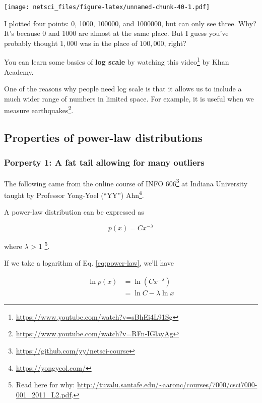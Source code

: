 \documentclass[
]{krantz}
\makeatletter
\renewcommand{\href}[2]{#2\footnote{\url{#1}}}
\newenvironment{kframe}{%
\medskip{}
\setlength{\fboxsep}{.8em}
 \def\at@end@of@kframe{}%
 \ifinner\ifhmode%
  \def\at@end@of@kframe{\end{minipage}}%
  \begin{minipage}{\columnwidth}%
 \fi\fi%
 \def\FrameCommand##1{\hskip\@totalleftmargin \hskip-\fboxsep
 \colorbox{shadecolor}{##1}\hskip-\fboxsep
     \hskip-\linewidth \hskip-\@totalleftmargin \hskip\columnwidth}%
 \MakeFramed {\advance\hsize-\width
   \@totalleftmargin\z@ \linewidth\hsize
   \@setminipage}}%
 {\par\unskip\endMakeFramed%
 \at@end@of@kframe}
\newenvironment{rmdblock}[1]
  {
  \begin{itemize}
  \renewcommand{\labelitemi}{
    \raisebox{-.7\height}[0pt][0pt]{
      {\setkeys{Gin}{width=3em,keepaspectratio}\texttt{[image: images/\#1]}}
    }
  }
  \setlength{\fboxsep}{1em}
  \begin{kframe}
  \item
  }
  {
  \end{kframe}
  \end{itemize}
  }
\newenvironment{rmdnote}
  {\begin{rmdblock}{note}}
  {\end{rmdblock}}
\makeatother
\begin{document}
\texttt{[image: netsci\_files/figure-latex/unnamed-chunk-40-1.pdf]}

I plotted four points: 0, 1000, 100000, and 1000000, but can only see three. Why? It's because 0 and 1000 are almost at the same place. But I guess you've probably thought \(1,000\) was in the place of \(100,000\), right?

You can learn some basics of \textbf{log scale} by watching \href{https://www.youtube.com/watch?v=sBhEi4L91Sg}{this video} by Khan Academy.

One of the reasons why people need log scale is that it allows us to include a much wider range of numbers in limited space. For example, it is useful \href{https://www.youtube.com/watch?v=RFn-IGlayAg}{when we measure earthquakes}.

\hypertarget{properties-of-power-law-distributions}{%
\subsection{Properties of power-law distributions}\label{properties-of-power-law-distributions}}

\hypertarget{porperty-1-a-fat-tail-allowing-for-many-outliers}{%
\subsubsection{Porperty 1: A fat tail allowing for many outliers}\label{porperty-1-a-fat-tail-allowing-for-many-outliers}}

\begin{rmdnote}
The following came from the online course of \href{https://github.com/yy/netsci-course}{INFO 606} at Indiana University taught by Professor \href{https://yongyeol.com/}{Yong-Yoel (``YY'') Ahn}.
\end{rmdnote}

A power-law distribution can be expressed as

\begin{equation} 
  p(x) = Cx^{-\lambda} \label{eq:power-law}
\end{equation}

where \(\lambda\) \textgreater{} 1 \footnote{Read here for why: \url{http://tuvalu.santafe.edu/~aaronc/courses/7000/csci7000-001_2011_L2.pdf}.}.

If we take a logarithm of Eq. \eqref{eq:power-law}, we'll have

\begin{align} 
  \ln p(x) & =  \ln (Cx^{-\lambda}) \\
  & = \ln C -\lambda \ln x \label{eq:power-law-simplified}
\end{align}
\end{document}

